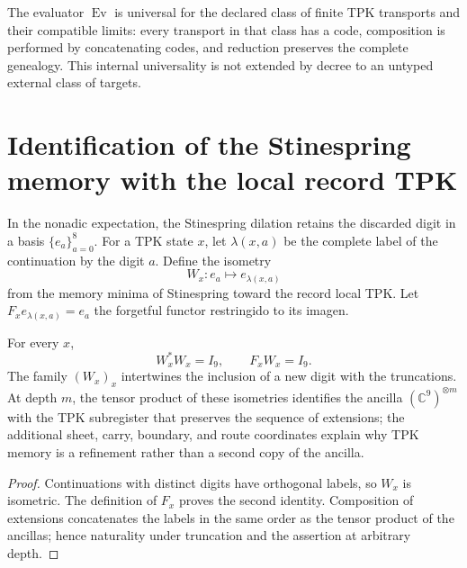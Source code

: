 \begin{corollary}
\label{cor:cpe-universalidad-genealogica}
The evaluator \(\operatorname{Ev}\) is universal for the declared class of finite TPK transports and their compatible limits: every transport in that class has a code, composition is performed by concatenating codes, and reduction preserves the complete genealogy. This internal universality is not extended by decree to an untyped external class of targets.
\end{corollary}

\section{Identification of the Stinespring memory with the local record TPK}
\label{sec:cpe-stinespring-tpk}

In the nonadic expectation, the Stinespring dilation retains the discarded digit
in a basis \(\{e_a\}_{a=0}^8\). For a TPK state \(x\), let
\(\lambda(x,a)\) be the complete label of the continuation by the digit
\(a\). Define the isometry
\[
 W_x:e_a\longmapsto e_{\lambda(x,a)}
\]
from the memory minima of Stinespring toward the record local TPK\@. Let
\(F_xe_{\lambda(x,a)}=e_a\) the forgetful functor restringido to its imagen.

\begin{theorem}
\label{thm:cpe-stinespring-tpk}
For every \(x\),
\[
 W_x^*W_x=I_9,
 \qquad F_xW_x=I_9.
\]
The family \((W_x)_x\) intertwines the inclusion of a new digit with the truncations. At depth \(m\), the tensor product of these isometries identifies the ancilla \((\mathbb C^9)^{\otimes m}\) with the TPK subregister that preserves the sequence of extensions; the additional sheet, carry, boundary, and route coordinates explain why TPK memory is a refinement rather than a second copy of the ancilla.
\end{theorem}

\begin{proof}
Continuations with distinct digits have orthogonal labels, so
\(W_x\) is isometric. The definition of \(F_x\) proves the second
identity. Composition of extensions concatenates the labels in the same
order as the tensor product of the ancillas; hence naturality under
truncation and the assertion at arbitrary depth.
\end{proof}
